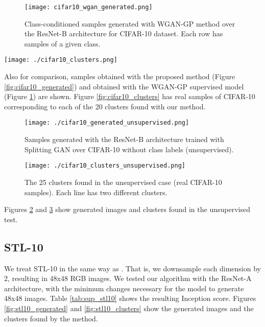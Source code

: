 \documentclass[times,twocolumn]{article}
\begin{document}
\begin{figure}
\centering
\texttt{[image: cifar10\_wgan\_generated.png]}
\caption{Class-conditioned samples generated with WGAN-GP method \cite{Gulrajani2017} over the ResNet-B architecture for CIFAR-10 dataset. Each row has samples of a given class.}
\label{fig:cifar10_wgan_generated}
\end{figure}


\begin{figure*}
 \centering
 \texttt{[image: ./cifar10\_clusters.png]}
 \caption{Real CIFAR-10 samples corresponding to the 20 clusters found by our method. Each line is divided in the same way as in Figure \ref{fig:cifar10_generated}.}
 \label{fig:cifar10_clusters}
\end{figure*}

Also for comparison, samples obtained with the proposed method (Figure \ref{fig:cifar10_generated}) and obtained with the WGAN-GP supervised model (Figure \ref{fig:cifar10_wgan_generated}) are shown. Figure \ref{fig:cifar10_clusters} has real samples of CIFAR-10 corresponding to each of the 20 clusters found with our method.


\begin{figure}
 \centering
 \texttt{[image: ./cifar10\_generated\_unsupervised.png]}
 \caption{Samples generated with the ResNet-B architecture trained with Splitting GAN over CIFAR-10 without class labels (unsupervised).}
 \label{fig:cifar10_generated_unsupervised}
\end{figure}


\begin{figure}
 \centering
 \texttt{[image: ./cifar10\_clusters\_unsupervised.png]}
\caption{The 25 clusters found in the unsupervised case (real CIFAR-10 samples). Each line has two different clusters.}
\label{fig:cifar10_clusters_unsupervised}
\end{figure}


Figures \ref{fig:cifar10_generated_unsupervised} and \ref{fig:cifar10_clusters_unsupervised} show generated images and clusters found in the unsupervised test.

\subsection{STL-10}
We treat STL-10 in the same way as \cite{WardeFarley2017}. That is, we downsample each dimension by 2, resulting in 48x48 RGB images. We tested our algorithm with the ResNet-A architecture, with the minimum changes necessary for the model to generate 48x48 images. Table \ref{tab:sup_stl10} shows the resulting Inception score.
Figures \ref{fig:stl10_generated} and \ref{fig:stl10_clusters} show the generated images and the clusters found by the method.
\end{document}
